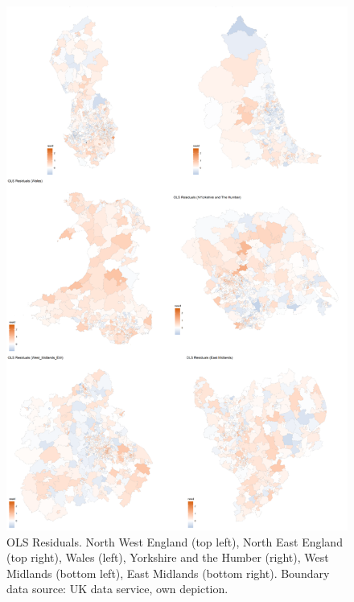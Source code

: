 \documentclass[12pt,twoside]{reedthesis}
\begin{document}
\begin{figure}
\includegraphics[width=0.95\linewidth]{figure/Figure_15} \caption{OLS Residuals. North West England (top left), North East England (top right), Wales (left), Yorkshire and the Humber (right), West Midlands (bottom left), East Midlands (bottom right). Boundary data source: UK data service, own depiction.}\label{fig:figure15}
\end{figure}
\end{document}

